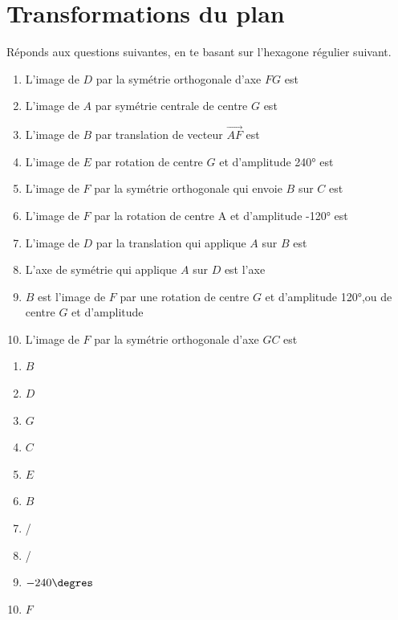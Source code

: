 \section{Transformations du plan}
\begin{exercise}
  Réponds aux questions suivantes, en te basant sur l'hexagone régulier suivant.
  \begin{center}
    
  \end{center}
  \begin{enumerate}[itemsep=2ex]
    \item L'image de $D$ par la symétrie orthogonale d'axe $FG$ est \dotfill
    \item L'image de $A$ par symétrie centrale de centre $G$ est \dotfill
    \item L'image de $B$ par translation de vecteur $\overrightarrow{AF}$ \dotfill
          est \dotfill
    \item L'image de $E$ par rotation de centre $G$ et d'amplitude \ang{+240} est \dotfill
    \item L'image de $F$ par la symétrie orthogonale qui envoie $B$ sur $C$ est \dotfill
    \item L'image de $F$ par la rotation de centre A et d'amplitude \ang{-120} est \dotfill
    \item L'image de $D$ par la translation qui applique $A$ sur $B$ est \dotfill
    \item L'axe de symétrie qui applique $A$ sur $D$ est l'axe \dotfill
    \item $B$ est l'image de $F$ par une rotation de centre $G$ et d'amplitude \ang{+120},ou de centre $G$ et d'amplitude \dotfill
    \item L'image de $F$ par la symétrie orthogonale d'axe $GC$ est \dotfill
  \end{enumerate}
\end{exercise}
\begin{solution}
  \begin{enumerate}[cols=5]
    \item $B$
    \item $D$
    \item $G$
    \item $C$
    \item $E$
    \item $B$
    \item /
    \item /
    \item $-240\degres$
    \item $F$
  \end{enumerate}
\end{solution}

